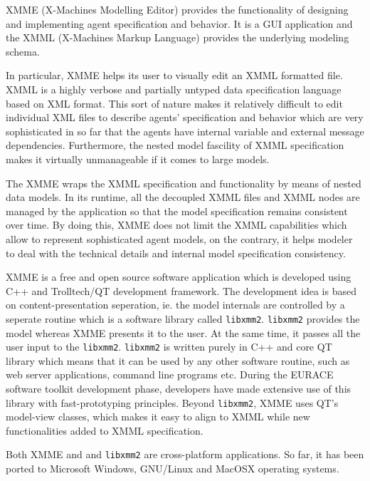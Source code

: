 XMME (X-Machines Modelling Editor) provides the functionality of
designing and implementing agent specification and behavior. It is a
GUI application and the XMML (X-Machines Markup Language) provides the
underlying modeling schema.

In particular, XMME helps its user to visually edit an XMML formatted
file. XMML is a highly verbose and partially untyped data
specification language based on XML format. This sort of nature makes
it relatively difficult to edit individual XML files to describe
agents' specification and behavior which are very sophisticated in so
far that the agents have internal variable and external message
dependencies. Furthermore, the nested model fascility of XMML
specification makes it virtually unmanageable if it comes to large
models.

The XMME wraps the XMML specification and functionality by means of
nested data models. In its runtime, all the decoupled XMML files and
XMML nodes are managed by the application so that the model
specification remains consistent over time. By doing this, XMME does
not limit the XMML capabilities which allow to represent sophisticated
agent models, on the contrary, it helps modeler to deal with the
technical details and internal model specification consistency.

\bigskip

XMME is a free and open source software application which is developed
using C++ and Trolltech/QT development framework. The development idea
is based on content-presentation seperation, ie. the model internals
are controlled by a seperate routine which is a software library
called \texttt{libxmm2}. \texttt{libxmm2} provides the model whereas
XMME presents it to the user. At the same time, it passes all the user
input to the \texttt{libxmm2}. \texttt{libxmm2} is written purely in
C++ and core QT library which means that it can be used by any other
software routine, such as web server applications, command line
programs etc. During the EURACE software toolkit development phase,
developers have made extensive use of this library with
fast-prototyping principles. Beyond \texttt{libxmm2}, XMME uses QT's
model-view classes, which makes it easy to align to XMML while new
functionalities added to XMML specification.

Both XMME and and \texttt{libxmm2} are cross-platform applications. So
far, it has been ported to Microsoft Windows, GNU/Linux and MacOSX
operating systems.

\bigskip

